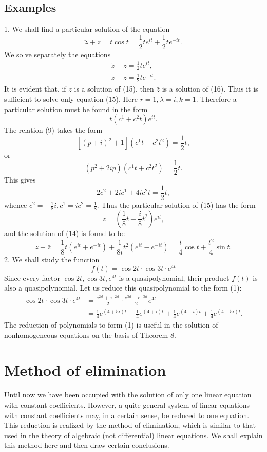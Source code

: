 \documentclass[10pt,a5paper]{book}
\theoremstyle{plain}
\theoremstyle{definition}
\theoremstyle{remark}
\begin{document}
\subsection*{Examples}
1. We shall find a particular solution of the equation
\begin{equation*}
\ddot{z}+z=t \cos t=\frac{1}{2} t e^{i t}+\frac{1}{2} t e^{-i t} . \tag{14}
\end{equation*}
We solve separately the equations
\begin{gather*}
\ddot{z}+z=\frac{1}{2} t e^{i t},  \tag{15}\\
\ddot{z}+z=\frac{1}{2} t e^{-i t} . \tag{16}
\end{gather*}
It is evident that, if $z$ is a solution of (15), then $\bar{z}$ is a solution of (16). Thus it is sufficient to solve only equation (15). Here $r=1, \lambda=i, k=1$. Therefore a particular solution must be found in the form
\[
t\left(c^{1}+c^{2} t\right) e^{i t} .
\]
The relation (9) takes the form
\[
\left[(p+i)^{2}+1\right]\left(c^{1} t+c^{2} t^{2}\right)=\frac{1}{2} t,
\]
or
\[
\left(p^{2}+2 i p\right)\left(c^{1} t+c^{2} t^{2}\right)=\frac{1}{2} t .
\]
This gives
\[
2 c^{2}+2 i c^{1}+4 i c^{2} t=\frac{1}{2} t,
\]
whence $c^{2}=-\frac{1}{8} i, c^{1}=i c^{2}=\frac{1}{8}$. Thus the particular solution of (15) has the form
\[
z=\left(\frac{1}{8} t-\frac{i}{8} t^{2}\right) e^{i t},
\]
and the solution of (14) is found to be
\[
z+\bar{z}=\frac{1}{8} t\left(e^{i t}+e^{-i t}\right)+\frac{1}{8 i} t^{2}\left(e^{i t}-e^{-i t}\right)=\frac{t}{4} \cos t+\frac{t^{2}}{4} \sin t .
\]
2. We shall study the function
\[
f(t)=\cos 2 t \cdot \cos 3 t \cdot e^{4 t}
\]
Since every factor $\cos 2 t, \cos 3 t, e^{4 t}$ is a quasipolynomial, their product $f(t)$ is also a quasipolynomial. Let us reduce this quasipolynomial to the form (1):
\[
\begin{aligned}
\cos 2 t \cdot \cos 3 t \cdot e^{4 t} & =\frac{e^{2 i t}+e^{-2 i t}}{2} \cdot \frac{e^{3 i t}+e^{-3 i t}}{2} e^{4 t} \\
& =\frac{1}{4} e^{(4+5 i) t}+\frac{1}{4} e^{(4+i) t}+\frac{1}{4} e^{(4-i) t}+\frac{1}{4} e^{(4-5 i) t} .
\end{aligned}
\]
The reduction of polynomials to form (1) is useful in the solution of nonhomogeneous equations on the basis of Theorem 8.

\section{Method of elimination}
Until now we have been occupied with the solution of only one linear equation with constant coefficients. However, a quite general system of linear equations with constant coefficients may, in a certain sense, be reduced to one equation. This reduction is realized by the method of elimination, which is similar to that used in the theory of algebraic (not differential) linear equations. We shall explain this method here and then draw certain conclusions.
\end{document}
